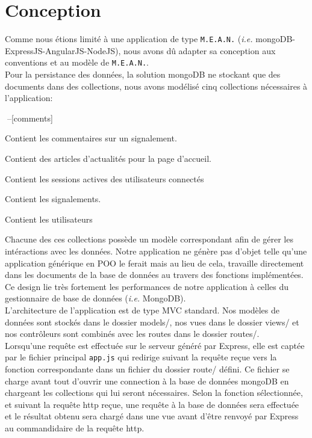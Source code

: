 \documentclass[a4paper,11pt]{article}
\begin{document}
\section{Conception}

Comme nous étions limité à une application de type \texttt{M.E.A.N.} (\textit{i.e.} \textsf{mongoDB-ExpressJS-AngularJS-NodeJS}), nous avons dû adapter sa conception aux conventions et au modèle de \texttt{M.E.A.N.}.\\

Pour la persistance des données, la solution \textsf{mongoDB} ne stockant que des documents dans des collections, nous avons modélisé cinq collections nécessaires à l'application:

\begin{desclist}{\sf}{\rm$\;$\hfill--}[comments]
	\item[comments] Contient les commentaires sur un signalement.
	\item[news] Contient des articles d'actualités pour la page d'accueil.
	\item[sessions] Contient les sessions actives des utilisateurs connectés
	\item[signals] Contient les signalements.
	\item[users] Contient les utilisateurs
\end{desclist}

Chacune des ces collections possède un modèle correspondant afin de gérer les intéractions avec les données. Notre application ne génère pas d'objet telle qu'une application générique en POO le ferait mais au lieu de cela, travaille directement dans les documents de la base de données au travers des fonctions implémentées. Ce design lie très fortement les performances de notre application à celles du gestionnaire de base de données (\textit{i.e.} \textsf{MongoDB}).\\

L'architecture de l'application est de type MVC standard. Nos modèles de données sont stockés dans le dossier \textsf{models/}, nos vues dans le dossier \textsf{views/} et nos contrôleurs sont combinés avec les routes dans le dossier \textsf{routes/}.\\

Lorsqu'une requête est effectuée sur le serveur généré par \textsf{Express}, elle est captée par le fichier principal \texttt{app.js} qui redirige suivant la requête reçue vers la fonction correspondante dans un fichier du dossier \textsf{route/} défini. Ce fichier se charge avant tout d'ouvrir une connection à la base de données \textsf{mongoDB} en chargeant les collections qui lui seront nécessaires. Selon la fonction sélectionnée, et suivant la requête \textsf{http} reçue, une requête à la base de données sera effectuée et le résultat obtenu sera chargé dans une vue avant d'être renvoyé par Express au commandidaire de la requête \textsf{http}.
\end{document}
